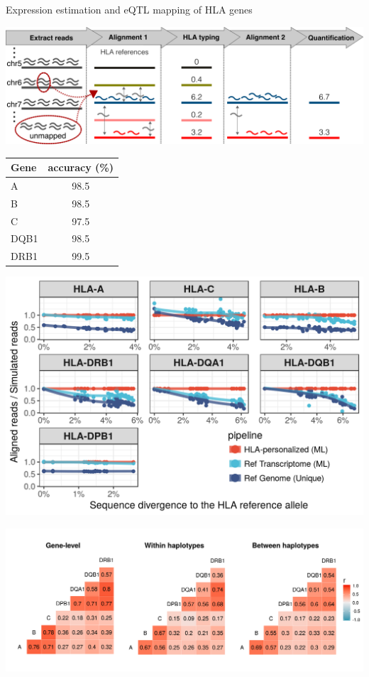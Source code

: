 \documentclass[10pt]{beamer}
\begin{document}
\begin{frame}{Expression estimation and eQTL mapping of HLA genes}
  \centering
  \begin{minipage}{0.6\textwidth}
  \includegraphics[width=\textwidth]{./Figures/method.png}
  \end{minipage}
  \hspace{5pt}
  \begin{tiny}
  \begin{tabular}{lc}
    \hline
    Gene & accuracy (\%) \\
    \hline
    A & 98.5  \\
    B & 98.5  \\
    C & 97.5  \\
    DQB1 & 98.5  \\
    DRB1 & 99.5  \\
    \hline
  \end{tabular}
  \end{tiny}
  \vfill

  \begin{minipage}{0.5\textwidth}
  \includegraphics[width=\textwidth]{./Figures/prop_mapped_divergence.png}
  \end{minipage}
  \begin{minipage}{0.45\textwidth}
  \includegraphics[width=\textwidth]{./Figures/correlations.png}
  \end{minipage}

\end{frame}
\end{document}
